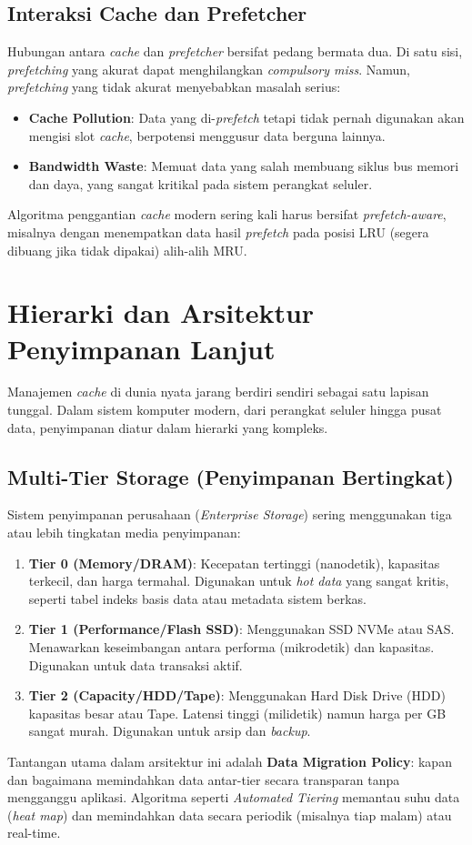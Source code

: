 \subsection{Interaksi Cache dan Prefetcher}
Hubungan antara \textit{cache} dan \textit{prefetcher} bersifat pedang
bermata dua. Di satu sisi, \textit{prefetching} yang akurat dapat
menghilangkan \textit{compulsory miss}. Namun, \textit{prefetching} yang
tidak akurat menyebabkan masalah serius:
\begin{itemize}
  \item \textbf{Cache Pollution}: Data yang di-\textit{prefetch} tetapi
    tidak pernah digunakan akan mengisi slot \textit{cache}, berpotensi
    menggusur data berguna lainnya.
  \item \textbf{Bandwidth Waste}: Memuat data yang salah membuang
    siklus bus memori dan daya, yang sangat kritikal pada sistem
    perangkat seluler.
\end{itemize}
Algoritma penggantian \textit{cache} modern sering kali harus bersifat
\textit{prefetch-aware}, misalnya dengan menempatkan data hasil
\textit{prefetch} pada posisi LRU (segera dibuang jika tidak dipakai)
alih-alih MRU.

\section{Hierarki dan Arsitektur Penyimpanan Lanjut}
Manajemen \textit{cache} di dunia nyata jarang berdiri sendiri sebagai
satu lapisan tunggal. Dalam sistem komputer modern, dari perangkat
seluler hingga pusat data, penyimpanan diatur dalam hierarki yang
kompleks.

\subsection{Multi-Tier Storage (Penyimpanan Bertingkat)}
Sistem penyimpanan perusahaan (\textit{Enterprise Storage}) sering menggunakan
tiga atau lebih tingkatan media penyimpanan:
\begin{enumerate}
  \item \textbf{Tier 0 (Memory/DRAM)}: Kecepatan tertinggi (nanodetik),
    kapasitas terkecil, dan harga termahal. Digunakan untuk \textit{hot data}
    yang sangat kritis, seperti tabel indeks basis data atau metadata
    sistem berkas.
  \item \textbf{Tier 1 (Performance/Flash SSD)}: Menggunakan SSD NVMe atau
    SAS. Menawarkan keseimbangan antara performa (mikrodetik) dan kapasitas.
    Digunakan untuk data transaksi aktif.
  \item \textbf{Tier 2 (Capacity/HDD/Tape)}: Menggunakan Hard Disk Drive (HDD)
    kapasitas besar atau Tape. Latensi tinggi (milidetik) namun harga per GB
    sangat murah. Digunakan untuk arsip dan \textit{backup}.
\end{enumerate}
Tantangan utama dalam arsitektur ini adalah \textbf{Data Migration Policy}:
kapan dan bagaimana memindahkan data antar-tier secara transparan tanpa
mengganggu aplikasi. Algoritma seperti \textit{Automated Tiering} memantau
suhu data (\textit{heat map}) dan memindahkan data secara periodik (misalnya
tiap malam) atau real-time.

